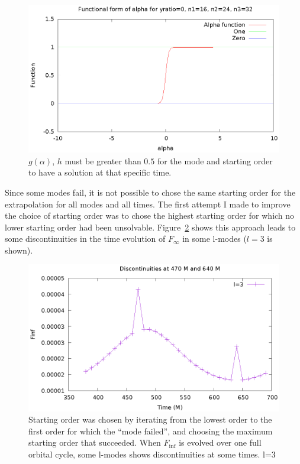 \begin{figure}
  \includegraphics{alphafunction}
  \caption{$g(\alpha)$, $h$ must be greater than $0.5$ for the mode and starting order to have a solution at that specific time.}
  \label{galpha}
\end{figure}



Since some modes fail, it is not possible to chose the same starting order for the extrapolation for all modes and all times. The first attempt I made to improve the choice of starting order was to chose the highest starting order for which no lower starting order had been unsolvable. Figure~\ref{finfovertimediscont} shows this approach leads to some discontinuities in the time evolution of $F_{\infty}$ in some l-modes ($l=3$ is shown). 





\begin{figure}
  \includegraphics{finfovertimel3discontinuities}
  \caption{Starting order was chosen by iterating from the lowest order to the first order for which the ``mode failed'', and choosing the maximum starting order that succeeded. When $F_{\inf}$ is evolved over one full orbital cycle, some l-modes shows discontinuities at some times. l=3}
\label{finfovertimediscont}
\end{figure}

